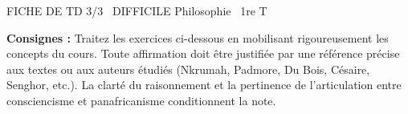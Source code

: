 \documentclass[11pt]{article}
\begin{document}
\begin{tcolorbox}[enhanced,colback=popink,colframe=popink,arc=10pt,boxrule=0pt,left=12pt,right=12pt,top=9pt,bottom=9pt]
{\color{white}\popxbold\small FICHE DE TD 3/3 \textbullet\ DIFFICILE \hfill Philosophie \textbullet\ 1re T\par}
\end{tcolorbox}
\vspace{4pt}
\noindent\textbf{Consignes :} Traitez les exercices ci-dessous en mobilisant rigoureusement les concepts du cours. Toute affirmation doit être justifiée par une référence précise aux textes ou aux auteurs étudiés (Nkrumah, Padmore, Du Bois, Césaire, Senghor, etc.). La clarté du raisonnement et la pertinence de l'articulation entre consciencisme et panafricanisme conditionnent la note.
\end{document}
